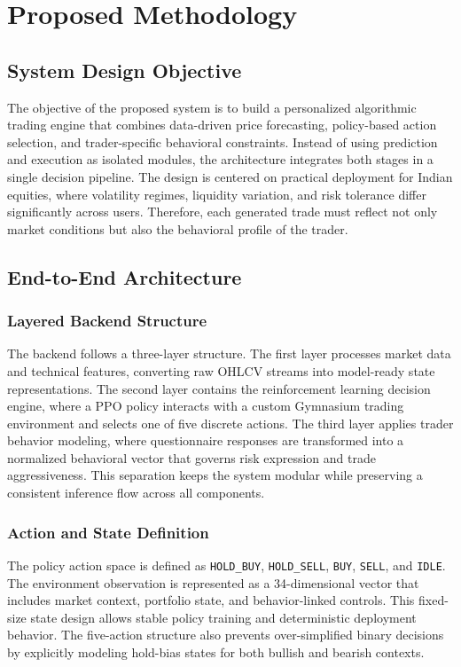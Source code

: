 \chapter{Proposed Methodology}

\section{System Design Objective}

The objective of the proposed system is to build a personalized algorithmic trading engine that combines data-driven price forecasting, policy-based action selection, and trader-specific behavioral constraints. Instead of using prediction and execution as isolated modules, the architecture integrates both stages in a single decision pipeline. The design is centered on practical deployment for Indian equities, where volatility regimes, liquidity variation, and risk tolerance differ significantly across users. Therefore, each generated trade must reflect not only market conditions but also the behavioral profile of the trader.

\section{End-to-End Architecture}

\subsection{Layered Backend Structure}

The backend follows a three-layer structure. The first layer processes market data and technical features, converting raw OHLCV streams into model-ready state representations. The second layer contains the reinforcement learning decision engine, where a PPO policy interacts with a custom Gymnasium trading environment and selects one of five discrete actions. The third layer applies trader behavior modeling, where questionnaire responses are transformed into a normalized behavioral vector that governs risk expression and trade aggressiveness. This separation keeps the system modular while preserving a consistent inference flow across all components.

\subsection{Action and State Definition}

The policy action space is defined as \texttt{HOLD\_BUY}, \texttt{HOLD\_SELL}, \texttt{BUY}, \texttt{SELL}, and \texttt{IDLE}. The environment observation is represented as a 34-dimensional vector that includes market context, portfolio state, and behavior-linked controls. This fixed-size state design allows stable policy training and deterministic deployment behavior. The five-action structure also prevents over-simplified binary decisions by explicitly modeling hold-bias states for both bullish and bearish contexts.

